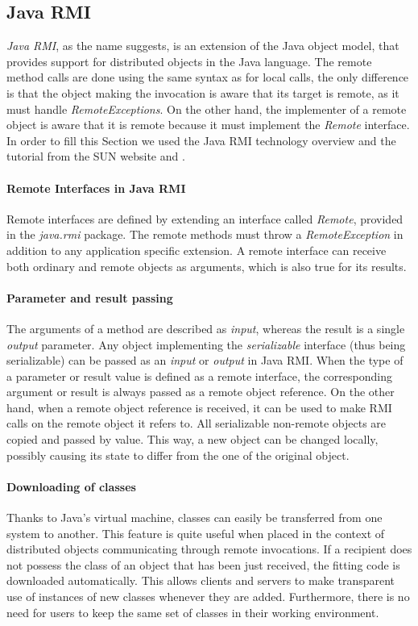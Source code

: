 
\subsection{Java RMI} 
\label{JavaRMI}   
\textit{Java RMI}, as the name suggests, is an extension of the Java object model, that provides support for distributed objects in the Java language. The remote method calls are done using the same syntax as for local calls, the only difference is that the object making the invocation is aware that its target is remote, as it must handle \textit{RemoteExceptions}. On the other hand, the implementer of a remote object is aware that it is remote because it must implement the \textit{Remote} interface. In order to fill this Section we used the Java RMI technology overview \cite{RMI-sun} and the tutorial from the SUN website \cite{RMI-client-sun} and \cite{RMI-overview-sun}.

\paragraph{Remote Interfaces in Java RMI}
Remote interfaces are defined by extending an interface called \textit{Remote}, provided in the \textit{java.rmi} package. The remote methods must throw a \textit{RemoteException} in addition to any application specific extension. A remote interface can receive both ordinary and remote objects as arguments, which is also true for its results.

\paragraph{Parameter and result passing}
The arguments of a method are described as \textit{input}, whereas the result is a single \textit{output} parameter. Any object implementing the \textit{serializable} interface (thus being serializable) can be passed as an \textit{input} or \textit{output} in Java RMI.
When the type of a parameter or result value is defined as a remote interface, the corresponding argument or result is always passed as a remote object reference. On the other hand, when a remote object reference is received, it can be used to make RMI calls on the remote object it refers to.
All serializable non-remote objects are copied and passed by value. This way, a new object can be changed locally, possibly causing its state to differ from the one of the original object.

\paragraph{Downloading of classes}
Thanks to Java's virtual machine, classes can easily be transferred from one system to another. This feature is quite useful when placed in the context of distributed objects communicating through remote invocations. If a recipient does not possess the class of an object that has been just received, the fitting code is downloaded automatically. This allows clients and servers to make transparent use of instances of new classes whenever they are added. Furthermore, there is no need for users to keep the same set of classes in their working environment.

